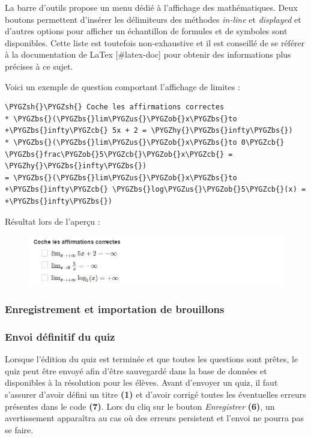 \documentclass[a4,10pt,french]{sphinxmanual}
\def\PYGZbs{\char`\\}
\def\PYGZus{\char`\_}
\def\PYGZob{\char`\{}
\def\PYGZcb{\char`\}}
\def\PYGZsh{\char`\#}
\def\PYGZhy{\char`\-}
\begin{document}
La barre d'outils propose un menu dédié à l'affichage des mathématiques. Deux boutons permettent d'insérer les délimiteurs des méthodes \emph{in-line} et \emph{displayed} et d'autres options pour afficher un échantillon de formules et de symboles sont disponibles. Cette liste est toutefois non-exhaustive et il est conseillé de se référer à la documentation de LaTex {[}\#latex-doc{]} pour obtenir des informations plus précises à ce sujet.

Voici un exemple de question comportant l'affichage de limites :

\begin{Verbatim}[commandchars=\\\{\}]
\PYGZsh{}\PYGZsh{} Coche les affirmations correctes
* \PYGZbs{}(\PYGZbs{}lim\PYGZus{}\PYGZob{}x\PYGZbs{}to +\PYGZbs{}infty\PYGZcb{} 5x + 2 = \PYGZhy{}\PYGZbs{}infty\PYGZbs{})
* \PYGZbs{}(\PYGZbs{}lim\PYGZus{}\PYGZob{}x\PYGZbs{}to 0\PYGZcb{} \PYGZbs{}frac\PYGZob{}5\PYGZcb{}\PYGZob{}x\PYGZcb{} = \PYGZhy{}\PYGZbs{}infty\PYGZbs{})
= \PYGZbs{}(\PYGZbs{}lim\PYGZus{}\PYGZob{}x\PYGZbs{}to +\PYGZbs{}infty\PYGZcb{} \PYGZbs{}log\PYGZus{}\PYGZob{}5\PYGZcb{}(x) = +\PYGZbs{}infty\PYGZbs{})
\end{Verbatim}

Résultat lors de l'aperçu :
\begin{figure}[htbp]\begin{flushleft}

\includegraphics{question-mathjax.png}
\label{doc-user:question-math}\end{flushleft}\end{figure}


\subsubsection{Enregistrement et importation de brouillons}
\label{doc-user:enregistrement-et-importation-de-brouillons}

\subsubsection{Envoi définitif du quiz}
\label{doc-user:envoi-definitif-du-quiz}
Lorsque l'édition du quiz est terminée et que toutes les questions sont prêtes, le quiz peut être envoyé afin d'être sauvegardé dans la base de données et disponibles à la résolution pour les élèves. Avant d'envoyer un quiz, il faut s'assurer d'avoir défini un titre \textbf{(1)} et d'avoir corrigé toutes les éventuelles erreurs présentes dans le code \textbf{(7)}. Lors du cliq sur le bouton \emph{Enregistrer} \textbf{(6)}, un avertissement apparaîtra au cas où des erreurs persistent et l'envoi ne pourra pas se faire.
\end{document}
